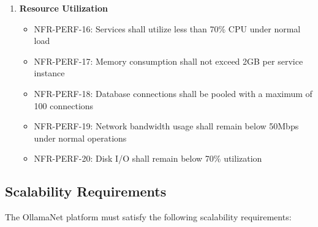 \begin{enumerate}
   \item \textbf{Resource Utilization}
   \begin{itemize}
      \item NFR-PERF-16: Services shall utilize less than 70\% CPU under normal load
      \item NFR-PERF-17: Memory consumption shall not exceed 2GB per service instance
      \item NFR-PERF-18: Database connections shall be pooled with a maximum of 100 connections
      \item NFR-PERF-19: Network bandwidth usage shall remain below 50Mbps under normal operations
      \item NFR-PERF-20: Disk I/O shall remain below 70\% utilization
   \end{itemize}
\end{enumerate}

\subsection{Scalability Requirements}

The OllamaNet platform must satisfy the following scalability requirements:

